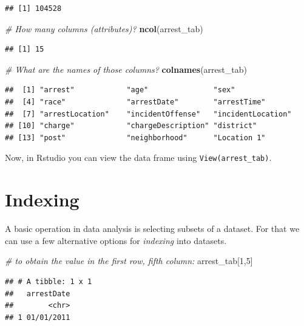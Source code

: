 \documentclass[12pt,]{book}
\newenvironment{Shaded}{\begin{snugshade}}{\end{snugshade}}
\newcommand{\KeywordTok}[1]{\textcolor[rgb]{0.13,0.29,0.53}{\textbf{#1}}}
\newcommand{\DecValTok}[1]{\textcolor[rgb]{0.00,0.00,0.81}{#1}}
\newcommand{\CommentTok}[1]{\textcolor[rgb]{0.56,0.35,0.01}{\textit{#1}}}
\newcommand{\NormalTok}[1]{#1}
\theoremstyle{definition}
\theoremstyle{definition}
\theoremstyle{remark}
\begin{document}
\begin{verbatim}
## [1] 104528
\end{verbatim}

\begin{Shaded}
\begin{Highlighting}[]
\CommentTok{# How many columns (attributes)?}
\KeywordTok{ncol}\NormalTok{(arrest_tab)}
\end{Highlighting}
\end{Shaded}

\begin{verbatim}
## [1] 15
\end{verbatim}

\begin{Shaded}
\begin{Highlighting}[]
\CommentTok{# What are the names of those columns?}
\KeywordTok{colnames}\NormalTok{(arrest_tab)}
\end{Highlighting}
\end{Shaded}

\begin{verbatim}
##  [1] "arrest"            "age"               "sex"              
##  [4] "race"              "arrestDate"        "arrestTime"       
##  [7] "arrestLocation"    "incidentOffense"   "incidentLocation" 
## [10] "charge"            "chargeDescription" "district"         
## [13] "post"              "neighborhood"      "Location 1"
\end{verbatim}

Now, in Rstudio you can view the data frame using
\texttt{View(arrest\_tab)}.

\section{Indexing}\label{indexing}

A basic operation in data analysis is selecting subsets of a dataset.
For that we can use a few alternative options for \emph{indexing} into
datasets.

\begin{Shaded}
\begin{Highlighting}[]
\CommentTok{# to obtain the value in the first row, fifth column:}
\NormalTok{arrest_tab[}\DecValTok{1}\NormalTok{,}\DecValTok{5}\NormalTok{]}
\end{Highlighting}
\end{Shaded}

\begin{verbatim}
## # A tibble: 1 x 1
##   arrestDate
##        <chr>
## 1 01/01/2011
\end{verbatim}
\end{document}
